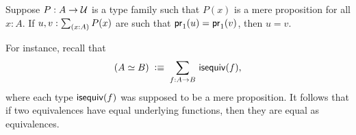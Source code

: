 \documentclass[hott-all.tex]{subfiles}
\begin{document}
\begin{lem}\label{thm:path-subset}
  Suppose $P:A\to\mathcal{U}$ is a type family such that $P(x)$ is a mere proposition for all $x:A$.
  If $u,v:\sm{x:A} P(x)$ are such that $\mathsf{pr}_{1}(u) = \mathsf{pr}_{1}(v)$, then $u=v$.
\end{lem}
%
For instance, recall that %
\[(\eqv A B) \;\defeq\; \sm{f:A\to B} \isequiv (f),\]
where each type $\mathsf{isequiv} (f)$ was supposed to be a mere proposition.
It follows that if two equivalences have equal underlying functions, then they are equal as equivalences.
\end{document}
